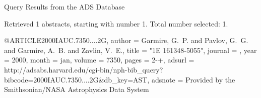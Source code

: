 Query Results from the ADS Database


Retrieved 1 abstracts, starting with number 1.  Total number selected: 1.

@ARTICLE{2000IAUC.7350....2G,
   author = {{Garmire}, G.~P. and {Pavlov}, G.~G. and {Garmire}, A.~B. and 
	{Zavlin}, V.~E.},
    title = "{1E 161348-5055}",
  journal = {\iaucirc},
     year = 2000,
    month = jan,
   volume = 7350,
    pages = {2-+},
   adsurl = {http://adsabs.harvard.edu/cgi-bin/nph-bib_query?bibcode=2000IAUC.7350....2G&db_key=AST},
  adsnote = {Provided by the Smithsonian/NASA Astrophysics Data System}
}



